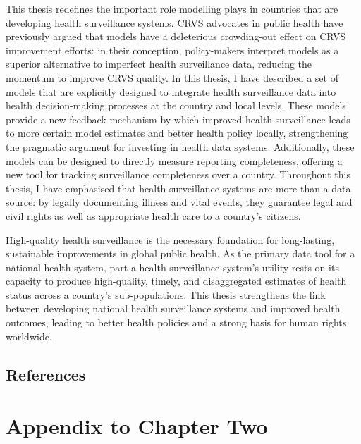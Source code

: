 \documentclass[
]{report}
\begin{document}
This thesis redefines the important role modelling plays in countries that are developing health surveillance systems. CRVS advocates in public health have previously argued that models have a deleterious crowding-out effect on CRVS improvement efforts: in their conception, policy-makers interpret models as a superior alternative to imperfect health surveillance data, reducing the momentum to improve CRVS quality.\autocite{Setel2007,Tichenor2020} In this thesis, I have described a set of models that are explicitly designed to integrate health surveillance data into health decision-making processes at the country and local levels. These models provide a new feedback mechanism by which improved health surveillance leads to more certain model estimates and better health policy locally, strengthening the pragmatic argument for investing in health data systems. Additionally, these models can be designed to directly measure reporting completeness, offering a new tool for tracking surveillance completeness over a country. Throughout this thesis, I have emphasised that health surveillance systems are more than a data source: by legally documenting illness and vital events, they guarantee legal and civil rights as well as appropriate health care to a country's citizens.\autocite{AbouZahr2015}

High-quality health surveillance is the necessary foundation for long-lasting, sustainable improvements in global public health. As the primary data tool for a national health system, part a health surveillance system's utility rests on its capacity to produce high-quality, timely, and disaggregated estimates of health status across a country's sub-populations. This thesis strengthens the link between developing national health surveillance systems and improved health outcomes, leading to better health policies and a strong basis for human rights worldwide.

\hypertarget{references-5}{%
\section{References}\label{references-5}}

\printbibliography[segment=\therefsegment,heading=none]

\hypertarget{appendix-appendices}{%
\appendix}

\hypertarget{appendix-to-chapter-two}{%
\chapter{Appendix to Chapter Two}\label{appendix-to-chapter-two}}
\end{document}
